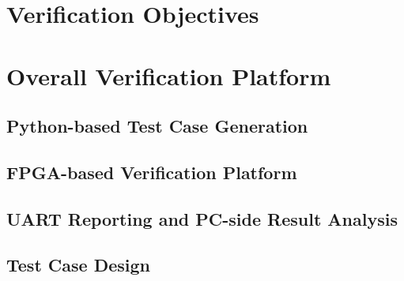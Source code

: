 \label{ch4:verification_and_results}

\section{Verification Objectives}

\section{Overall Verification Platform}


\subsection{Python-based Test Case Generation}

\subsection{FPGA-based Verification Platform}

\subsection{UART Reporting and PC-side Result Analysis}

\subsection{Test Case Design}

